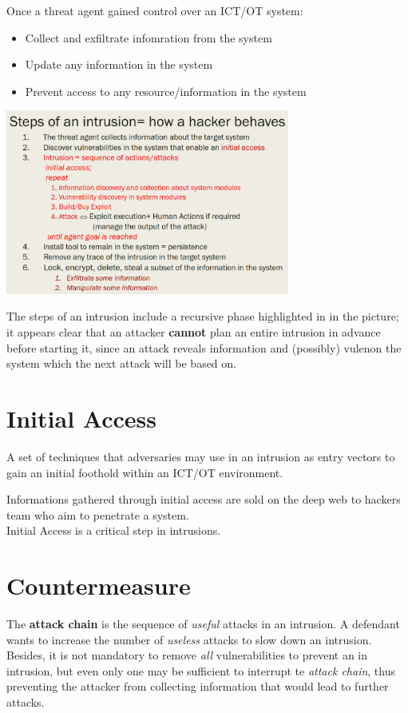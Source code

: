 Once a threat agent gained control over an ICT/OT system:
\begin{itemize}
    \item Collect and exfiltrate infomration from the system
    \item Update any information in the system
    \item Prevent access to any resource/information in the system
\end{itemize}
\begin{center}
\includegraphics[width=0.7\textwidth]{images/intrusion_steps.png}
\end{center}
The steps of an intrusion include a recursive phase highlighted in  in the picture;
it appears clear that an attacker \textbf{cannot} plan an entire intrusion in advance before starting it,
since an attack reveals information and (possibly) vulenon the system which the next attack will be based on.

\section{Initial Access}
A set of techniques that adversaries may use in an intrusion as entry vectors to gain an initial foothold within an ICT/OT environment.

Informations gathered through initial access are sold on the deep web to hackers team who aim to penetrate a system.\\
Initial Access is a critical step in intrusions.

\section{Countermeasure}
The \textbf{attack chain} is the sequence of \textit{useful} attacks in an intrusion.
A defendant wants to increase the number of \textit{useless} attacks to slow down an intrusion.
Besides, it is not mandatory to remove \textit{all} vulnerabilities to prevent an in intrusion,
but even only one may be sufficient to interrupt te \textit{attack chain}, 
thus preventing the attacker from collecting information that would lead to further attacks.\nl

